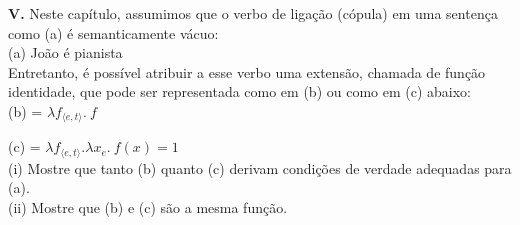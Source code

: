 \begin{tcolorbox}[parbox=false,boxrule=0pt,sharp corners,breakable]
\n\textbf{V.} Neste capítulo, assumimos que o verbo de ligação
(cópula) em uma sentença como (a) é semanticamente vácuo:\\

\n (a) João é pianista\\

\n Entretanto, é possível atribuir a esse verbo uma extensão,
chamada de função identidade, que pode ser representada como em
(b) ou como em (c) abaixo:\\

\n (b)  = $\lambda f_{\langle e,t\rangle}.\ f $

\n (c)  = $\lambda f_{\langle e,t\rangle}.\lambda x_{e}.\
f(x)=1$\\

\n (i) Mostre que tanto (b) quanto (c) derivam condições de
verdade adequadas para (a).\\

\n (ii) Mostre que (b) e (c) são a mesma função.


\end{tcolorbox}













